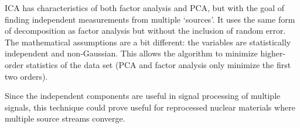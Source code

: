 \Gls{ICA} has characteristics of both factor analysis and \gls{PCA}, but with
the goal of finding independent measurements from multiple `sources'.  It uses
the same form of decomposition as factor analysis but without the inclusion of
random error. The mathematical assumptions are a bit different: the variables
are statistically independent and non-Gaussian.  This allows the algorithm to
minimize higher-order statistics of the data set (\gls{PCA} and factor analysis
only minimize the first two orders).

Since the independent components are useful in signal processing of multiple
signals, this technique could prove useful for reprocessed nuclear materials
where multiple source streams converge. 

